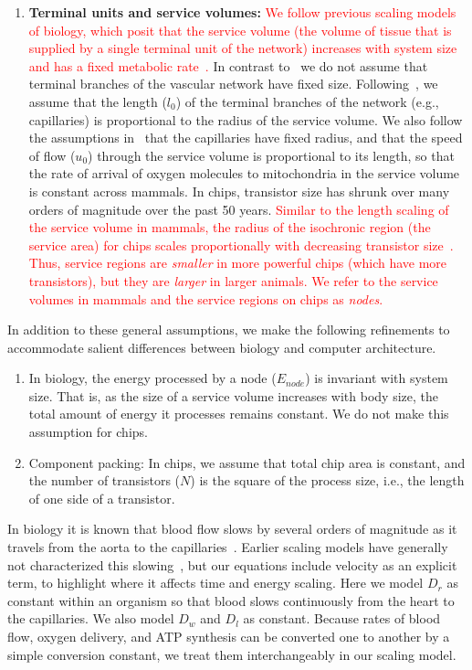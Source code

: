 \documentclass[12pt]{article}
\newcommand{\red}[1]{\textcolor{red}{#1}}
\begin{document}
\begin{enumerate}
\item {\bf Terminal units and service volumes:} \red{We follow previous scaling
    models of biology, which posit that the service volume (the volume of
    tissue that is supplied by a single terminal unit of the network) increases with
  system size and has a fixed metabolic rate~\cite{west97, banavar10}.}  In contrast to~\cite{west97} we do not assume that terminal branches of the vascular network have fixed size. Following~\cite{banavar10}, we assume that the length ($l_0$) of the terminal branches of the network (e.g., capillaries) is
  proportional to the radius of the service volume.  We also follow
  the assumptions in~\cite{banavar10} that the capillaries have fixed
  radius, and that the speed of flow ($u_0$) through the service volume is
  proportional to its length, so that the rate of arrival of oxygen
  molecules to mitochondria in the service volume is constant across mammals.   In
  chips, transistor size has shrunk over many orders of
  magnitude over the past 50 years.
\red{Similar to the length scaling of the service volume in mammals, the
radius of the isochronic region (the service area) for chips scales
proportionally with decreasing transistor size~\cite{moses08}. Thus,
	service regions are \emph{smaller} in more powerful chips (which have more transistors), but they are \emph{larger} in larger animals. We refer to the service volumes in mammals and the service regions on chips as \emph{nodes}.}
\end{enumerate}

In addition to these general assumptions, we make the following
refinements to accommodate salient differences between biology and computer architecture.
\begin{enumerate}
\item In biology, the energy processed by a node 
  ($E_{node}$) is invariant with system size. That is, as the size of a service volume
  increases with body size, the total amount of energy it processes
  remains constant. We do not make this assumption for chips.

\item Component packing: In chips, we assume that total chip area is constant, and the
  number of transistors ($N$) is the square of the process size, i.e.,
  the length of one side of a transistor. 

\end{enumerate}

\noindent 

In biology it is known that blood flow slows by several orders of magnitude as
it travels from the aorta to the capillaries~\cite{west97}.
Earlier scaling models have generally not characterized this
slowing~\cite{west97, banavar10}, but
our equations include velocity as an explicit term, to highlight where it affects time and energy
scaling. Here we model $D_r$ as constant within an organism so that blood slows continuously from the heart to the capillaries. We also model $D_w$ and $D_l$ as constant. Because rates of blood flow, oxygen delivery, and ATP synthesis can be converted one to another by a simple conversion constant, we treat them interchangeably in our scaling model.
\end{document}
